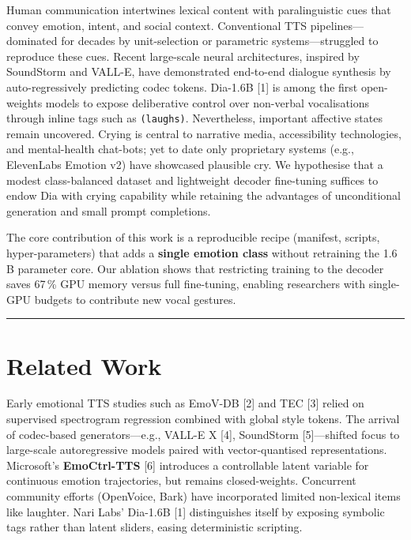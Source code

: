 \documentclass{article}
\begin{document}
Human communication intertwines lexical content with paralinguistic cues
that convey emotion, intent, and social context. Conventional TTS
pipelines---dominated for decades by unit-selection or parametric
systems---struggled to reproduce these cues. Recent large-scale neural
architectures, inspired by SoundStorm and VALL-E, have demonstrated
end-to-end dialogue synthesis by auto-regressively predicting codec
tokens. Dia-1.6B {[}1{]} is among the first open-weights models to
expose deliberative control over non-verbal vocalisations through inline
tags such as \texttt{(laughs)}. Nevertheless, important affective states
remain uncovered. Crying is central to narrative media, accessibility
technologies, and mental-health chat-bots; yet to date only proprietary
systems (e.g., ElevenLabs Emotion v2) have showcased plausible cry. We
hypothesise that a modest class-balanced dataset and lightweight decoder
fine-tuning suffices to endow Dia with crying capability while retaining
the advantages of unconditional generation and small prompt completions.

The core contribution of this work is a reproducible recipe (manifest,
scripts, hyper-parameters) that adds a \textbf{single emotion class}
without retraining the 1.6\,B parameter core. Our ablation shows that
restricting training to the decoder saves 67\,\% GPU memory versus full
fine-tuning, enabling researchers with single-GPU budgets to contribute
new vocal gestures.

\begin{center}\rule{0.5\linewidth}{0.5pt}\end{center}

\hypertarget{related-work}{%
\section{Related Work}\label{related-work}}

Early emotional TTS studies such as EmoV-DB {[}2{]} and TEC {[}3{]}
relied on supervised spectrogram regression combined with global style
tokens. The arrival of codec-based generators---e.g., VALL-E X {[}4{]},
SoundStorm {[}5{]}---shifted focus to large-scale autoregressive models
paired with vector-quantised representations. Microsoft's
\textbf{EmoCtrl-TTS} {[}6{]} introduces a controllable latent variable
for continuous emotion trajectories, but remains closed-weights.
Concurrent community efforts (OpenVoice, Bark) have incorporated limited
non-lexical items like laughter. Nari Labs' Dia-1.6B {[}1{]}
distinguishes itself by exposing symbolic tags rather than latent
sliders, easing deterministic scripting.
\end{document}
